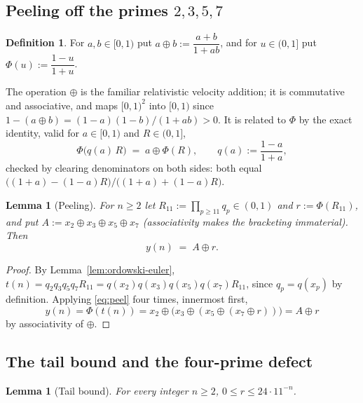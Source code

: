 \documentclass[11pt]{article}
\theoremstyle{plain}
\newtheorem{lemma}[theorem]{Lemma}
\theoremstyle{definition}
\newtheorem{definition}[theorem]{Definition}
\theoremstyle{remark}
\numberwithin{equation}{section}
\begin{document}
\subsection{Peeling off the primes $2,3,5,7$}

\begin{definition}
For $a,b \in [0,1)$ put $a \oplus b := \dfrac{a+b}{1+ab}$, and for $u \in (0,1]$ put
$\Phi(u) := \dfrac{1-u}{1+u}$.
\end{definition}

The operation $\oplus$ is the familiar relativistic velocity addition; it is commutative and
associative, and maps $[0,1)^2$ into $[0,1)$ since $1-(a\oplus b) = (1-a)(1-b)/(1+ab) > 0$. It is
related to $\Phi$ by the exact identity, valid for $a \in [0,1)$ and $R \in (0,1]$,
\begin{equation}
  \Phi\bigl(q(a)\,R\bigr) \;=\; a \oplus \Phi(R), \qquad q(a) := \frac{1-a}{1+a},
  \label{eq:peel}
\end{equation}
checked by clearing denominators on both sides: both equal
$\bigl((1+a)-(1-a)R\bigr) / \bigl((1+a)+(1-a)R\bigr)$.

\begin{lemma}[Peeling]
\label{lem:oplus-peel}
For $n \ge 2$ let $R_{11} := \prod_{p \ge 11} q_p \in (0,1)$ and $r := \Phi(R_{11})$, and put
$A := x_2 \oplus x_3 \oplus x_5 \oplus x_7$ (associativity makes the bracketing immaterial). Then
\[
  y(n) \;=\; A \oplus r.
\]
\end{lemma}

\begin{proof}
By Lemma~\ref{lem:ordowski-euler}, $t(n) = q_2 q_3 q_5 q_7 R_{11} = q(x_2)q(x_3)q(x_5)q(x_7)R_{11}$,
since $q_p = q(x_p)$ by definition. Applying \eqref{eq:peel} four times, innermost first,
\[
  y(n) = \Phi(t(n)) = x_2 \oplus \bigl(x_3 \oplus (x_5 \oplus (x_7 \oplus r))\bigr) = A \oplus r
\]
by associativity of $\oplus$.
\end{proof}

\subsection{The tail bound and the four-prime defect}

\begin{lemma}[Tail bound]
\label{lem:ordowski-tail}
For every integer $n \ge 2$, $0 \le r \le 24 \cdot 11^{-n}$.
\end{lemma}
\end{document}
